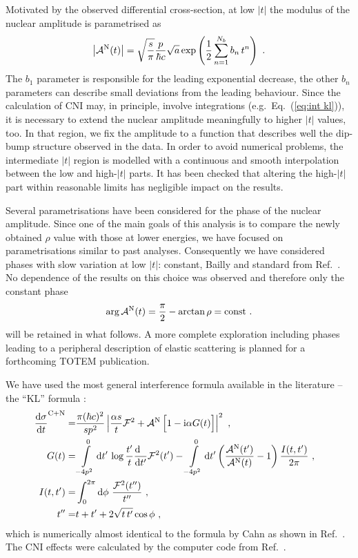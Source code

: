 Motivated by the observed differential cross-section, at low $|t|$ the modulus of the nuclear amplitude is parametrised as
\begin{equation}
\label{eq:nuc mod}
\left | {\cal A}^{\rm N}(t) \right | = \sqrt{s\over\pi} {p\over \hbar c} \sqrt{a} \exp\left( {1\over 2} \sum\limits_{n = 1}^{N_b} b_n\, t^n \right)\ .
\end{equation}
The $b_1$ parameter is responsible for the leading exponential decrease, the other $b_n$ parameters can describe small deviations from the leading behaviour. Since the calculation of CNI may, in principle, involve integrations (e.g.~Eq.~(\ref{eq:int kl})), it is necessary to extend the nuclear amplitude meaningfully to higher $|t|$ values, too. In that region, we fix the amplitude to a function that describes well the dip-bump structure observed in the data. In order to avoid numerical problems, the intermediate $|t|$ region is modelled with a continuous and smooth interpolation between the low and high-$|t|$ parts. It has been checked that altering the high-$|t|$ part within reasonable limits has negligible impact on the results.

Several parametrisations have been considered for the phase of the nuclear amplitude. Since one of the main goals of this analysis is to compare the newly obtained $\rho$ value with those at lower energies, we have focused on parametrisations similar to past analyses. Consequently we have considered phases with slow variation at low $|t|$: constant, Bailly and standard from Ref.~\cite{totem-8tev-1km}. No dependence of the results on this choice was observed and therefore only the constant phase
\begin{equation}
\label{eq:nuc phase con}
\arg {\cal A}^{\rm N}(t) = {\pi\over 2} - \arctan\rho = \hbox{const} \ .
\end{equation}
will be retained in what follows. A more complete exploration including phases leading to a peripheral description of elastic scattering is planned for a forthcoming TOTEM publication.

We have used the most general interference formula available in the literature -- the ``KL'' formula \cite{kl94}:
\begin{equation}
\label{eq:int kl}
	\begin{aligned}
		{\d\sigma\over \d t}^{\rm C+N} =& {\pi (\hbar c)^2 \over s p^2} \left | {\alpha s\over t} {\cal F}^2
			+ {\cal A}^{\rm N}\, \Big[1 - \I\alpha G(t)\Big] \right |^2\ ,\cr
		G(t) =& \int\limits_{-4p^2}^0 \d t'\, \log {t'\over t} {\d\phantom{t'}\over \d t'} {\cal F}^2(t')
			  - \int\limits_{-4p^2}^0 \d t' \left( {{\cal A}^{\rm N}(t') \over {\cal A}^{\rm N}(t)} - 1 \right) { I(t, t')\over 2\pi }\ , \cr
		I(t, t') =& \int_0^{2\pi} \d\phi\ {{\cal F}^2(t'')\over t''}\ ,\cr
		t'' =& t + t' + 2\sqrt{t\, t'} \cos\phi\ ,\cr
	\end{aligned}
\end{equation}
which is numerically almost identical to the formula by Cahn \cite{cahn82} as shown in Ref.~\cite{totem-8tev-1km}. The CNI effects were calculated by the computer code from Ref.~\cite{elegent}.


